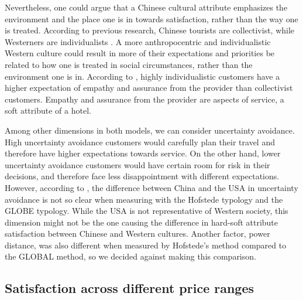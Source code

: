 \documentclass[smallextended,natbib]{svjour3}       %
\begin{document}
    Nevertheless, one could argue that a Chinese cultural attribute emphasizes the environment and the place one is in towards satisfaction, rather than the way one is treated. According to previous research, Chinese tourists are collectivist, while Westerners are individualists \cite[][]{kim2000}. A more anthropocentric and individualistic Western culture could result in more of their expectations and priorities be related to how one is treated in social circumstances, rather than the environment one is in. According to \cite{donthu1998cultural}, highly individualistic customers have a higher expectation of empathy and assurance from the provider than collectivist customers. Empathy and assurance from the provider are aspects of service, a soft attribute of a hotel. 

    Among other dimensions in both models, we can consider uncertainty avoidance. High uncertainty avoidance customers would carefully plan their travel and therefore have higher expectations towards service. On the other hand, lower uncertainty avoidance customers would have certain room for risk in their decisions, and therefore face less disappointment with different expectations. However, according to \cite{xiumei2011cultural}, the difference between China and the USA in uncertainty avoidance is not so clear when measuring with the Hofstede typology and the GLOBE typology. While the USA is not representative of Western society, this dimension might not be the one causing the difference in hard-soft attribute satisfaction between Chinese and Western cultures. Another factor, power distance, was also different when measured by Hofstede's method compared to the GLOBAL method, so we decided against making this comparison.

  \subsection{Satisfaction across different price ranges}\label{disc:price}
\end{document}
